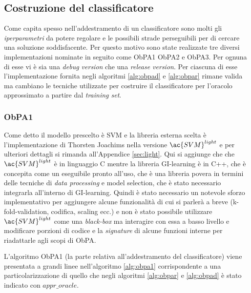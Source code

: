 \subsection{Costruzione del classificatore}
Come capita spesso nell'addestramento di un classificatore  sono molti gli \textit{iperparametri} da potere regolare e le possibili strade perseguibili per di cercare una soluzione soddisfacente. Per questo motivo sono state realizzate tre diversi implementazioni nominate in seguito come \ac{ObPA}1 \ac{ObPA}2 e \ac{ObPA}3. Per ognuna di esse vi è sia una \textit{debug version} che una \textit{release version}. Per ciascuna di esse l'implementazione fornita negli algoritmi \ref{alg:obpad} e \ref{alg:obpar} rimane valida ma cambiano le tecniche utilizzate per costruire il classificatore per l'oracolo approssimato a partire dal \textit{training set}.

\subsubsection{ObPA1}
Come detto il modello prescelto è \ac{SVM} e la libreria esterna scelta è l'implementazione di Thorsten Joachims nella versione $\ac{SVM}^{light}$ e per ulteriori dettagli si rimanda all'Appendice \ref{sec:light}. Qui si aggiunge che che $\ac{SVM}^{light}$ è in linguaggio C mentre la libreria GI-learning è in C++, che è concepita come un eseguibile pronto all'uso, che è una libreria povera  in termini delle tecniche di \textit{data processing} e model selection, che è stato necessario integrarla all'interno di GI-learning. Quindi è stato necessario un notevole sforzo implementativo per aggiungere alcune funzionalità di cui si parlerà a breve (k-fold-validation, codifica, scaling ecc.) e non è stato possibile utilizzare  $\ac{SVM}^{light}$ come una \textit{black-box} ma interagire con essa a basso livello e modificare porzioni di codice e la \textit{signature} di alcune funzioni interne per riadattarle agli scopi di \ac{ObPA}.

L'algoritmo \ac{ObPA}1 (la parte relativa all'addestramento del classificatore) viene presentata a grandi linee nell'algoritmo \ref{alg:obpa1} corrispondente a una particolarizzazione di quello che negli algoritmi \ref{alg:obpar} e \ref{alg:obpad} è stato indicato con $appr\_oracle$.

